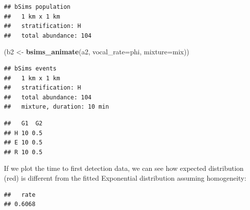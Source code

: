 \documentclass[12pt,]{book}
\newenvironment{Shaded}{\begin{snugshade}}{\end{snugshade}}
\newcommand{\DataTypeTok}[1]{\textcolor[rgb]{0.13,0.29,0.53}{#1}}
\newcommand{\KeywordTok}[1]{\textcolor[rgb]{0.13,0.29,0.53}{\textbf{#1}}}
\newcommand{\NormalTok}[1]{#1}
\newcommand{\OperatorTok}[1]{\textcolor[rgb]{0.81,0.36,0.00}{\textbf{#1}}}
\newcommand{\StringTok}[1]{\textcolor[rgb]{0.31,0.60,0.02}{#1}}
\begin{document}
\begin{verbatim}
## bSims population
##   1 km x 1 km
##   stratification: H
##   total abundance: 104
\end{verbatim}

\begin{Shaded}
\begin{Highlighting}[]
\NormalTok{(b2 <-}\StringTok{ }\KeywordTok{bsims_animate}\NormalTok{(a2, }\DataTypeTok{vocal_rate=}\NormalTok{phi, }\DataTypeTok{mixture=}\NormalTok{mix))}
\end{Highlighting}
\end{Shaded}

\begin{verbatim}
## bSims events
##   1 km x 1 km
##   stratification: H
##   total abundance: 104
##   mixture, duration: 10 min
\end{verbatim}

\begin{Shaded}
\end{Shaded}

\begin{verbatim}
##   G1  G2
## H 10 0.5
## E 10 0.5
## R 10 0.5
\end{verbatim}

If we plot the time to first detection data, we can see how
expected distribution (red) is different from the fitted
Exponential distribution assuming homogeneity:

\begin{Shaded}
\end{Shaded}

\begin{verbatim}
##   rate 
## 0.6068
\end{verbatim}
\end{document}
